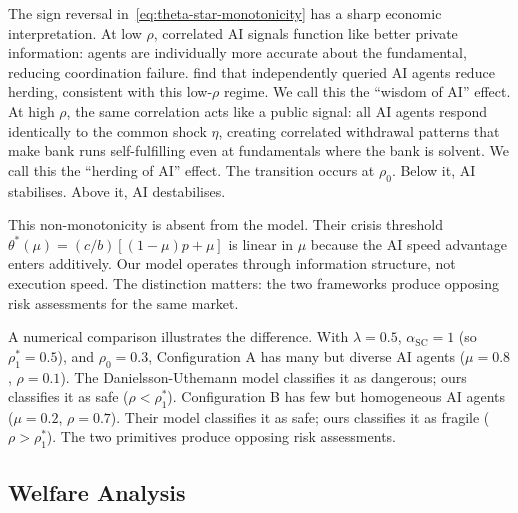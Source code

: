 The sign reversal in~\eqref{eq:theta-star-monotonicity} has a sharp economic interpretation. At low $\rho$, correlated AI signals function like better private information: agents are individually more accurate about the fundamental, reducing coordination failure. \citet{hansen2025} find that independently queried AI agents reduce herding, consistent with this low-$\rho$ regime. We call this the ``wisdom of AI'' effect. At high $\rho$, the same correlation acts like a public signal: all AI agents respond identically to the common shock $\eta$, creating correlated withdrawal patterns that make bank runs self-fulfilling even at fundamentals where the bank is solvent. We call this the ``herding of AI'' effect. The transition occurs at $\rho_0$. Below it, AI stabilises. Above it, AI destabilises.

This non-monotonicity is absent from the \citet{danielsson2025} model. Their crisis threshold $\theta^*(\mu) = (c/b)[(1-\mu)p + \mu]$ is linear in $\mu$ because the AI speed advantage enters additively. Our model operates through information structure, not execution speed. The distinction matters: the two frameworks produce opposing risk assessments for the same market.

A numerical comparison illustrates the difference. With $\lambda = 0.5$, $\alpha_{\text{SC}} = 1$ (so $\rho_1^* = 0.5$), and $\rho_0 = 0.3$, Configuration A has many but diverse AI agents ($\mu = 0.8$, $\rho = 0.1$). The Danielsson-Uthemann model classifies it as dangerous; ours classifies it as safe ($\rho < \rho_1^*$). Configuration B has few but homogeneous AI agents ($\mu = 0.2$, $\rho = 0.7$). Their model classifies it as safe; ours classifies it as fragile ($\rho > \rho_1^*$). The two primitives produce opposing risk assessments.

\subsection{Welfare Analysis}


